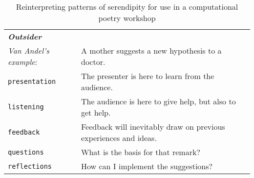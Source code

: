 \begin{table}[p]
\begin{tabular}{lp{}}
{\bf\emph{Outsider}} & \\
\emph{Van Andel's example}: & A mother suggests a new hypothesis to a doctor. \\[.2cm]
{\tt presentation}& The presenter is here to learn from the audience. \\
{\tt listening} & The audience is here to give help, but also to get help.\\
{\tt feedback} & Feedback will inevitably draw on previous experiences and ideas.\\
{\tt questions} & What is the basis for that remark?\\
{\tt reflections} & How can I implement the suggestions?\\
\end{tabular}

\caption{Reinterpreting patterns of serendipity for use in a computational poetry workshop\label{tab:reinterpret}}
\end{table}
